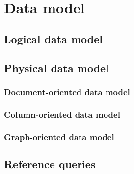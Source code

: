 \section{Data model}
\label{sec:data-model}

\subsection{Logical data model}
\label{sec:logical-data-model}

\subsection{Physical data model}
\label{sec:physical-data-model}

\subsubsection{Document-oriented data model}
\label{sec:document-data-model}

\subsubsection{Column-oriented data model}
\label{sec:column-data-model}

\subsubsection{Graph-oriented data model}
\label{sec:graph-data-model}

\subsection{Reference queries}
\label{sec:reference-queries}

